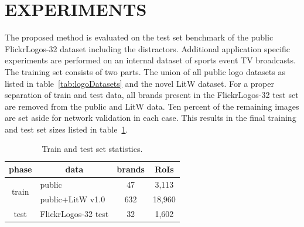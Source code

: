 \documentclass[a4paper,twoside]{article}
\begin{document}
\section{\uppercase{Experiments}}
%
\noindent The proposed method is evaluated on the test set benchmark of the public FlickrLogos-32 dataset including the distractors. Additional application specific experiments are performed on an internal dataset of sports event TV broadcasts. 
The training set consists of two parts. The union of all public logo datasets as listed in table~\ref{tab:logoDatasets} and the novel \ac{LitW} dataset. For a proper separation of train and test data, all brands present in the FlickrLogos-32 test set are removed from the public and \ac{LitW} data. Ten percent of the remaining images are set aside for network validation in each case. This results in the final training and test set sizes listed in table~\ref{tab:trainTestStatistics}.
%
\begin{table}[t]
\centering
\begingroup	
\setlength{\tabcolsep}{6pt}
\caption{Train and test set statistics.}
\label{tab:trainTestStatistics}
\begin{small}
\begin{tabular}{cl|cc}
\textbf{phase} & \multicolumn{1}{c|}{\textbf{data}} & \multicolumn{1}{c}{\textbf{brands}} & \multicolumn{1}{c}{\textbf{RoIs}} \bigstrut[b]\\
\hline
\multirow{2}[2]{*}{train} & public & 47    & 3,113 \bigstrut[t]\\
      & public+\ac{LitW} v1.0 & 632   & 18,960 \bigstrut[b]\\
\hline
test  & FlickrLogos-32 test & 32    & 1,602 \bigstrut[t]\\
\end{tabular}%
\end{small}
\endgroup
\end{table}
\end{document}
